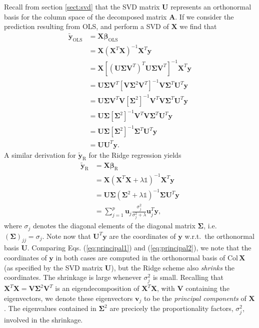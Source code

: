 \documentclass[a4paper, twocolumn]{article}
\begin{document}
Recall from section \ref{sect:svd} that the SVD matrix $\mathbf{U}$ represents an orthonormal basis for the column space of the decomposed matrix $\mathbf{A}$. If we consider the prediction resulting from OLS, and perform a SVD of $\mathbf{X}$ we find that
\begin{align}
\tilde{\mathbf{y}}_\text{OLS} &= \mathbf{X}\bm\beta_\text{OLS} \nonumber \\
%
&= \mathbf{X}\left(\mathbf{X}^T\mathbf{X}\right)^{-1}\mathbf{X}^T\mathbf{y} \nonumber \\
%
&= \mathbf{X} \left[ \left(\mathbf{U}\bm\Sigma \mathbf{V}^T\right)^T \mathbf{U}\bm\Sigma \mathbf{V}^T \right]^{-1} \mathbf{X}^T \mathbf{y} \nonumber \\
%
&= \mathbf{U}\bm\Sigma \mathbf{V}^T \left[\mathbf{V}\bm\Sigma^2 \mathbf{V}^T \right]^{-1} \mathbf{V}\bm\Sigma^T \mathbf{U}^T\mathbf{y} \nonumber \\
%
&= \mathbf{U}\bm\Sigma \mathbf{V}^T \mathbf{V} \left[\bm\Sigma^2  \right]^{-1}  \mathbf{V}^T \mathbf{V}\bm\Sigma^T \mathbf{U}^T\mathbf{y} \nonumber \\
%
&= \mathbf{U}\bm\Sigma \left[\bm\Sigma^2  \right]^{-1}  \mathbf{V}^T \mathbf{V}\bm\Sigma^T \mathbf{U}^T\mathbf{y} \nonumber \\
%
&= \mathbf{U}\bm\Sigma \left[\bm\Sigma^2  \right]^{-1} \bm\Sigma^T \mathbf{U}^T\mathbf{y} \nonumber \\
%
&= \mathbf{U}\mathbf{U}^T\mathbf{y}. \label{eq:principal1}
\end{align}
A similar derivation for $\tilde{\mathbf{y}}_\text{R}$ for the Ridge regression yields
\begin{align}
\tilde{\mathbf{y}}_\text{R} &= \mathbf{X}\bm\beta_\text{R} \nonumber \\
%
&= \mathbf{X}\left(\mathbf{X}^T\mathbf{X}+\lambda \mathds{1}\right)^{-1}\mathbf{X}^T\mathbf{y} \nonumber \\
%
&= \mathbf{U}\bm\Sigma\left(\bm\Sigma^2 + \lambda \mathds{1}\right)^{-1}\bm\Sigma \mathbf{U}^T\mathbf{y} \nonumber \\
%
&= \sum_{j=1}^p \mathbf{u}_j \frac{\sigma_j^2}{\sigma_j^2+\lambda}\mathbf{u}_j^T\mathbf{y}, \label{eq:principal2}
\end{align}
where $\sigma_j$ denotes the diagonal elements of the diagonal matrix $\bm\Sigma$, i.e.\ $(\bm\Sigma)_{jj}=\sigma_j$. Note now that $\mathbf{U}^T\mathbf{y}$ are the coordinates of $\mathbf{y}$ w.r.t.\ the orthonormal basis $\mathbf{U}$. Comparing Eqs. (\ref{eq:principal1}) and (\ref{eq:principal2}), we note that the coordinates of $\mathbf{y}$ in both cases are computed in the orthonormal basis of $\text{Col}\,\mathbf{X}$ (as specified by the SVD matrix $\mathbf{U}$), but the Ridge scheme also \textit{shrinks} the coordinates. The shrinkage is large whenever $\sigma_j^2$ is small. Recalling that $\mathbf{X}^T\mathbf{X}=\mathbf{V}\bm\Sigma^2\mathbf{V}^T$ is an eigendecomposition of $\mathbf{X}^T\mathbf{X}$, with $\mathbf{V}$ containing the eigenvectors, we denote these eigenvectors $\mathbf{v}_j$ to be the \textit{principal components} of $\mathbf{X}$. The eigenvalues contained in $\bm\Sigma^2$ are precicely the proportionality factors, $\sigma^2_j$, involved in the shrinkage. 
\end{document}
